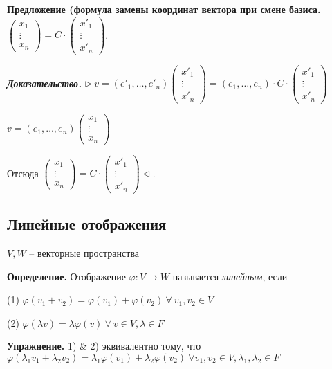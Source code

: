 \textbf{Предложение (формула замены координат вектора при смене базиса.} $\begin{pmatrix} x_1 \\ \vdots \\ x_n \end{pmatrix} = C \cdot \begin{pmatrix} x'_1 \\ \vdots \\ x'_n \end{pmatrix}$.

\textbf{\textit{Доказательство.}} $\rhd \ v = (e'_1, \dots, e'_n) \begin{pmatrix} x'_1 \\ \vdots \\ x'_n \end{pmatrix} = (e_1, \dots, e_n) \cdot C \cdot \begin{pmatrix} x'_1 \\ \vdots \\ x'_n \end{pmatrix}$

$v = (e_1, \dots, e_n) \begin{pmatrix} x_1 \\ \vdots \\ x_n \end{pmatrix}$

Отсюда $\begin{pmatrix} x_1 \\ \vdots \\ x_n \end{pmatrix} = C \cdot \begin{pmatrix} x'_1 \\ \vdots \\ x'_n \end{pmatrix} \lhd$.

\subsection{Линейные отображения}
$V, W$ -- векторные пространства

\vspace{\baselineskip}
\textbf{Определение.} Отображение $\varphi: V \rightarrow W$ называется \textit{линейным}, если 

(1) $\varphi(v_1 + v_2) = \varphi(v_1) + \varphi(v_2) \ \forall \ v_1, v_2 \in V$

(2) $\varphi(\lambda v) = \lambda \varphi(v) \ \forall \ v \in V, \lambda \in F$

\vspace{\baselineskip}
\textbf{Упражнение.} 1) \& 2) эквивалентно тому, что $\varphi(\lambda_1 v_1 + \lambda_2 v_2) = \lambda_1 \varphi(v_1) + \lambda_2 \varphi(v_2) \ \forall v_1, v_2 \in V, \lambda_1, \lambda_2 \in F$

